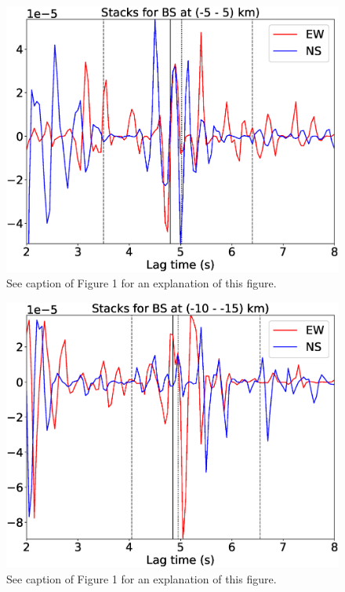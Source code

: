 \documentclass[letterpaper, 12pt]{article}
\begin{document}
\begin{figure}[H]
\includegraphics[width=\linewidth]{figures/intervals/BS_-05_005_stacks.eps}
\caption{See caption of Figure 1 for an explanation of this figure.}
\end{figure}

\begin{figure}[H]
\includegraphics[width=\linewidth]{figures/intervals/BS_-10_-15_stacks.eps}
\caption{See caption of Figure 1 for an explanation of this figure.}
\end{figure}
\end{document}
